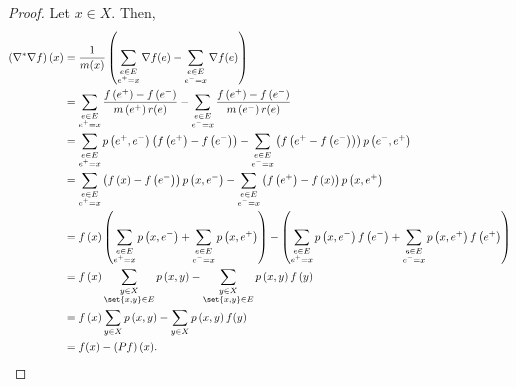 \documentclass[10pt]{mypackage}
\begin{document}
\begin{proof}
  Let $x\in X$. Then,
  \begin{align*}
    \left( \nabla^{\ast}\nabla f \right)(x) &= \frac{1}{m(x)} \left( \sum_{\substack{e\in E\\ e^{+}=x}} \nabla f(e) - \sum_{\substack{e\in E \\ e^{-}=x}} \nabla f(e) \right) \\
                                            &= \sum_{\substack{e\in E\\ e^{+}=x}}\frac{f\left( e^{+} \right)-f\left( e^{-} \right)}{m\left( e^{+} \right)r(e)} - \sum_{\substack{e\in E \\ e^{-}=x}} \frac{f\left( e^{+} \right)-f\left( e^{-} \right)}{m\left( e^{-} \right)r(e)}\\
                                            &= \sum_{\substack{e\in E\\e^{+}=x}} p\left( e^{+},e^{-} \right)\left( f\left( e^{+} \right)-f\left( e^{-} \right) \right) - \sum_{\substack{e\in E \\ e^{-}=x}}\left( f\left( e^{+}-f\left( e^{-} \right) \right) \right)p\left( e^{-},e^{+} \right)\\
                                            &= \sum_{\substack{e\in E \\ e^{+}=x}}\left( f\left( x \right)-f\left( e^{-} \right) \right)p\left( x,e^{-} \right)-\sum_{\substack{e\in E \\ e^{-}=x}}\left( f\left( e^{+} \right)-f\left( x \right) \right)p\left( x,e^{+} \right)\\
                                            &= f\left( x \right)\left( \sum_{\substack{e\in E \\ e^{+}=x}}p\left( x,e^{-} \right) + \sum_{\substack{e\in E \\ e^{-}=x}}p\left( x,e^{+} \right) \right) - \left( \sum_{\substack{e\in E\\e^{+}=x}}p\left( x,e^{-} \right)f\left( e^{-} \right) + \sum_{\substack{e\in E \\ e^{-}=x}}p\left( x,e^{+} \right)f\left( e^{+} \right) \right)\\
                                            &= f\left( x \right)\sum_{\substack{y\in X \\ \set{x,y}\in E}} p\left( x,y \right) - \sum_{\substack{y\in X \\ \set{x,y}\in E}} p\left( x,y \right)f\left( y \right)\\
                                            &= f\left( x \right)\sum_{y\in X} p\left( x,y \right) - \sum_{y\in X}p\left( x,y \right)f(y)\\
                                            &= f(x)-\left( Pf \right)(x).
  \end{align*}
\end{proof}
\end{document}
